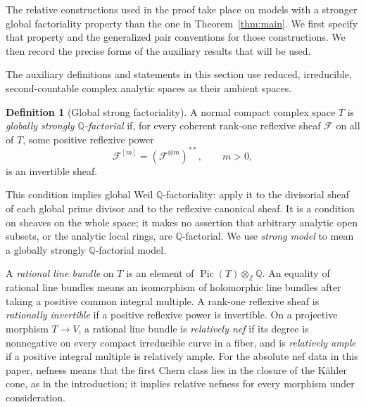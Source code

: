 \documentclass[11pt]{amsart}
\theoremstyle{definition}
\newtheorem{definition}[theorem]{Definition}
\theoremstyle{remark}
\numberwithin{equation}{section}
\newcommand{\Q}{\mathbb{Q}}
\newcommand{\Z}{\mathbb{Z}}
\DeclareMathOperator{\Pic}{Pic}
\begin{document}
The relative constructions used in the proof take place on models with a
stronger global factoriality property than the one in
Theorem~\ref{thm:main}.  We first specify that property and the generalized
pair conventions for those constructions.  We then record the precise
forms of the auxiliary results that will be used.

The auxiliary definitions and statements in this section use reduced,
irreducible, second-countable complex analytic spaces as their ambient
spaces.

\begin{definition}[Global strong factoriality]\label{def:strong-factoriality}
A normal compact complex space \(T\) is \emph{globally strongly
\(\Q\)-factorial} if, for every coherent rank-one reflexive sheaf
\(\mathcal F\) on all of \(T\), some positive reflexive power
\[
 \mathcal F^{[m]}=(\mathcal F^{\otimes m})^{**},\qquad m>0,
\]
is an invertible sheaf.
\end{definition}

This condition implies global Weil \(\Q\)-factoriality: apply it to the
divisorial sheaf of each global prime divisor and to the reflexive canonical
sheaf.  It is a condition on sheaves on the whole space; it makes no assertion
that arbitrary analytic open subsets, or the analytic local rings, are
\(\Q\)-factorial.  We use \emph{strong model} to mean a globally strongly
\(\Q\)-factorial model.

A \emph{rational line bundle} on \(T\) is an element of
\(\Pic(T)\otimes_{\Z}\Q\).  An equality of rational line bundles means an
isomorphism of holomorphic line bundles after taking a positive common
integral multiple.  A rank-one reflexive sheaf is \emph{rationally
invertible} if a positive reflexive power is invertible.  On a projective
morphism \(T\to V\), a rational line bundle is \emph{relatively nef} if
its degree is nonnegative on every compact irreducible curve in a fiber,
and is \emph{relatively ample} if a positive integral multiple is relatively
ample.  For the absolute nef data in this paper, nefness means that the
first Chern class lies in the closure of the K\"ahler cone, as in the
introduction; it implies relative nefness for every morphism under
consideration.
\end{document}
